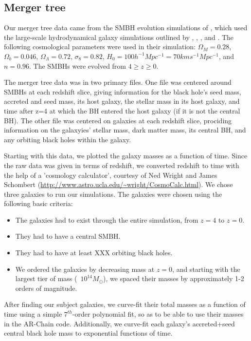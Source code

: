 \documentclass[english, apj]{emulateapj}
\begin{document}
\subsection{Merger tree}
Our merger tree data came from the SMBH evolution simulations of \citet{2015ApJ...799..178K}, which used the large-scale hydrodynamical galaxy simulations outlined by \citet{2011ApJ...741...99C}, \citet{2011ApJ...742L..33C}, \citet{2012ApJ...753...17C}, \citet{2012ApJ...748..121C} and \citet{2013ApJ...770..139C}.  The following cosmological parameters were used in their simulation:   $\Omega_M = 0.28$, $\Omega_b = 0.046$, $\Omega_\Lambda = 0.72$, $\sigma_8 = 0.82$, $H_0 = 100h^{-1}Mpc^{-1} = 70 km s^{-1} Mpc^{-1}$, and $n = 0.96$.  The SMBHs were evolved from $4\geq z \geq 0$.

The merger tree data was in two primary files.  One file was centered around SMBHs at each redshift slice, giving information for the black hole's seed mass, accreted and seed mass, its host galaxy, the stellar mass in its host galaxy, and time after z=4 at which the BH entered the host galaxy (if it is not the central BH).  The other file was centered on galaxies at each redshift slice, prociding information on the galaxyies' stellar mass, dark matter mass, its central BH, and any orbiting black holes within the galaxy.

Starting with this data, we plotted the galaxy masses as a function of time.  Since the raw data was given in terms of redshift, we converted redshift to time with the help of a 'cosmology calculator', courtesy of Ned Wright and James Schombert (\url{http://www.astro.ucla.edu/~wright/CosmoCalc.html}).  We chose three galaxies to run our simulations.  The galaxies were chosen using the following basic criteria:
\begin{itemize}
\item The galaxies had to exist through the entire simulation, from $z=4$ to $z=0$.
\item They had to have a central SMBH.
\item They had to have at least XXX orbiting black holes.
\item We ordered the galaxies by decreasing mass at $z=0$, and starting with the largest tier of mass (~$10^{14} M_{\odot}$), we spaced their masses by approximately 1-2 orders of magnitude.
\end{itemize}

After finding our subject galaxies, we curve-fit their total masses as a function of time using a simple $7^{th}$-order polynomial fit, so as to be able to use their masses in the AR-Chain code.  Additionally, we curve-fit each galaxy's accreted+seed central black hole mass to exponential functions of time.
\end{document}
